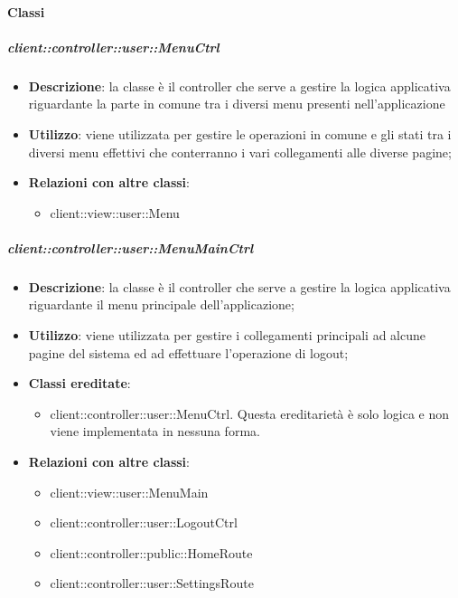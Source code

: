	\paragraph{Classi} %
		\subparagraph{client::controller::user::MenuCtrl} %
		\label{subp:client_controller_user_menuctrl}
			\begin{itemize}
				\item \textbf{Descrizione}: la classe è il controller che serve a gestire la logica applicativa riguardante la parte in comune tra i diversi menu presenti nell'applicazione
				\item \textbf{Utilizzo}: viene utilizzata per gestire le operazioni in comune e gli stati tra i diversi menu effettivi che conterranno i vari collegamenti alle diverse pagine;
				\item \textbf{Relazioni con altre classi}:
					\begin{itemize}
						\item client::view::user::Menu
					\end{itemize}
			\end{itemize}

		\subparagraph{client::controller::user::MenuMainCtrl} %
		\label{subp:client_controller_user_menumainctrl}
			\begin{itemize}
				\item \textbf{Descrizione}: la classe è il controller che serve a gestire la logica applicativa riguardante il menu principale dell'applicazione;
				\item \textbf{Utilizzo}: viene utilizzata per gestire i collegamenti principali ad alcune pagine del sistema ed ad effettuare l'operazione di logout;
				\item \textbf{Classi ereditate}:
					\begin{itemize}
						\item client::controller::user::MenuCtrl. Questa ereditarietà è solo logica e non viene implementata in nessuna forma.
					\end{itemize}
				\item \textbf{Relazioni con altre classi}:
					\begin{itemize}
						\item client::view::user::MenuMain
						\item client::controller::user::LogoutCtrl
						\item client::controller::public::HomeRoute
						\item client::controller::user::SettingsRoute
					\end{itemize}
			\end{itemize}

